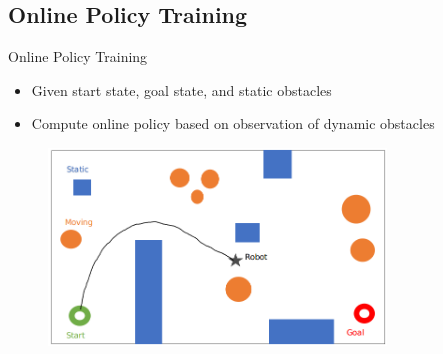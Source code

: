 \documentclass[xcolor=x11names,compress]{beamer}
\renewcommand{\(}{\begin{columns}}
\renewcommand{\)}{\end{columns}}
\newcommand{\<}[1]{\begin{column}{#1}}
\renewcommand{\>}{\end{column}}
\begin{document}
\subsection{Online Policy Training}
\begin{frame}{Online Policy Training}
\begin{itemize}
\item Given start state, goal state, and static obstacles
\item Compute online policy based on observation of dynamic obstacles
\end{itemize}
\begin{figure}
\centering
\includegraphics[width=0.8\textwidth]{./figures/problem1.png}
\end{figure}
\end{frame}

\end{document}
